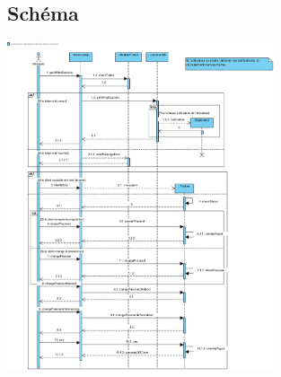 \newpage
\begin{figure}[h]
\subsection{Schéma}
\centering
\includegraphics[width = 0.7\textwidth]{extension-maxime/sequence/img/sequence-extension.png}
\end{figure}
